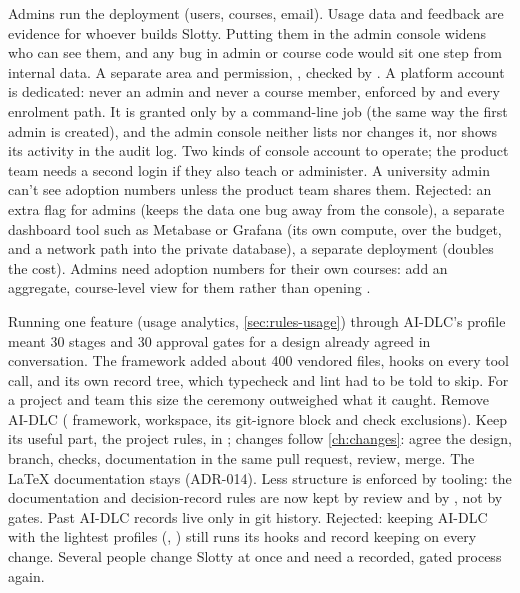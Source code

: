   {Admins run the deployment (users, courses, email). Usage data and feedback are evidence for
   whoever builds Slotty. Putting them in the admin console widens who can see them, and any
   bug in admin or course code would sit one step from internal data.}
  {A separate  area and permission, , checked by
   . A platform account is dedicated: never an admin and never a course
   member, enforced by  and every enrolment path. It is granted only by a
   command-line job (the same way the first admin is created), and the admin console neither
   lists nor changes it, nor shows its activity in the audit log.}
  {Two kinds of console account to operate; the product team needs a second login if they also
   teach or administer. A university admin can't see adoption numbers unless the product team
   shares them. Rejected: an extra flag for admins (keeps the data one bug away from the
   console), a separate dashboard tool such as Metabase or Grafana (its own compute, over the
   budget, and a network path into the private database), a separate deployment (doubles the
   cost).}
  {Admins need adoption numbers for their own courses: add an aggregate, course-level view for
   them rather than opening .}

  {Running one feature (usage analytics, \cref{sec:rules-usage}) through AI-DLC's 
   profile meant 30 stages and 30 approval gates for a design already agreed in conversation. The
   framework added about 400 vendored files, hooks on every tool call, and its own record tree,
   which typecheck and lint had to be told to skip. For a project and team this size the ceremony
   outweighed what it caught.}
  {Remove AI-DLC ( framework,  workspace, its git-ignore block and check
   exclusions). Keep its useful part, the project rules, in ; changes follow
   \cref{ch:changes}: agree the design, branch, checks, documentation in the same pull request,
   review, merge. The LaTeX documentation stays (ADR-014).}
  {Less structure is enforced by tooling: the documentation and decision-record rules are now kept
   by review and by , not by gates. Past AI-DLC records live only in git history.
   Rejected: keeping AI-DLC with the lightest profiles (, ) still runs
   its hooks and record keeping on every change.}
  {Several people change Slotty at once and need a recorded, gated process again.}


